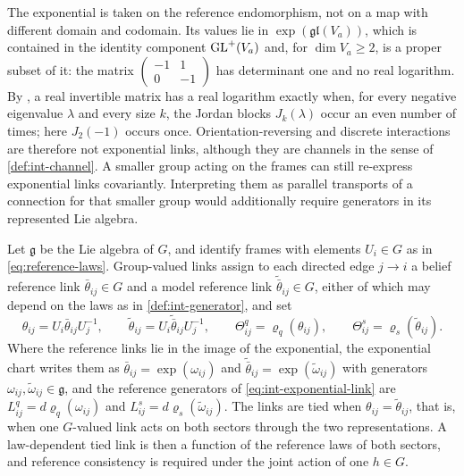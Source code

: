 The exponential is taken on the reference endomorphism, not on a map with different domain and codomain. Its values lie in $\exp(\mathfrak{gl}(V_a))$, which is contained in the identity component $\mathrm{GL}^+(V_a)$ and, for $\dim V_a\ge2$, is a proper subset of it: the matrix $\begin{pmatrix}-1&1\\0&-1\end{pmatrix}$ has determinant one and no real logarithm. By \citet{Culver1966}, a real invertible matrix has a real logarithm exactly when, for every negative eigenvalue $\lambda$ and every size $k$, the Jordan blocks $J_k(\lambda)$ occur an even number of times; here $J_2(-1)$ occurs once. Orientation-reversing and discrete interactions are therefore not exponential links, although they are channels in the sense of \cref{def:int-channel}. A smaller group acting on the frames can still re-express exponential links covariantly. Interpreting them as parallel transports of a connection for that smaller group would additionally require generators in its represented Lie algebra.

Let $\mathfrak g$ be the Lie algebra of $G$, and identify frames with elements $U_i\in G$ as in \cref{eq:reference-laws}. Group-valued links assign to each directed edge $j\to i$ a belief reference link $\bar\theta_{ij}\in G$ and a model reference link $\tilde{\bar\theta}_{ij}\in G$, either of which may depend on the laws as in \cref{def:int-generator}, and set
\begin{equation}
\theta_{ij}=U_i\bar\theta_{ij}U_j^{-1},\qquad
\tilde\theta_{ij}=U_i\tilde{\bar\theta}_{ij}U_j^{-1},\qquad
\Theta_{ij}^q=\varrho_q(\theta_{ij}),\qquad
\Theta_{ij}^s=\varrho_s(\tilde\theta_{ij}).
\label{eq:int-group-links}
\end{equation}
Where the reference links lie in the image of the exponential, the exponential chart writes them as $\bar\theta_{ij}=\exp(\omega_{ij})$ and $\tilde{\bar\theta}_{ij}=\exp(\tilde\omega_{ij})$ with generators $\omega_{ij},\tilde\omega_{ij}\in\mathfrak g$, and the reference generators of \cref{eq:int-exponential-link} are $L_{ij}^q=d\varrho_q(\omega_{ij})$ and $L_{ij}^s=d\varrho_s(\tilde\omega_{ij})$. The links are tied when $\theta_{ij}=\tilde\theta_{ij}$, that is, when one $G$-valued link acts on both sectors through the two representations. A law-dependent tied link is then a function of the reference laws of both sectors, and reference consistency is required under the joint action of one $h\in G$.

